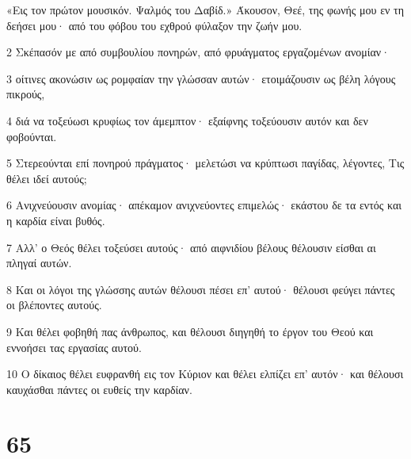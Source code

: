 \par «Εις τον πρώτον μουσικόν. Ψαλμός του Δαβίδ.» Άκουσον, Θεέ, της φωνής μου εν τη δεήσει μου· από του φόβου του εχθρού φύλαξον την ζωήν μου.
\par 2 Σκέπασόν με από συμβουλίου πονηρών, από φρυάγματος εργαζομένων ανομίαν·
\par 3 οίτινες ακονώσιν ως ρομφαίαν την γλώσσαν αυτών· ετοιμάζουσιν ως βέλη λόγους πικρούς,
\par 4 διά να τοξεύωσι κρυφίως τον άμεμπτον· εξαίφνης τοξεύουσιν αυτόν και δεν φοβούνται.
\par 5 Στερεούνται επί πονηρού πράγματος· μελετώσι να κρύπτωσι παγίδας, λέγοντες, Τις θέλει ιδεί αυτούς;
\par 6 Ανιχνεύουσιν ανομίας· απέκαμον ανιχνεύοντες επιμελώς· εκάστου δε τα εντός και η καρδία είναι βυθός.
\par 7 Αλλ' ο Θεός θέλει τοξεύσει αυτούς· από αιφνιδίου βέλους θέλουσιν είσθαι αι πληγαί αυτών.
\par 8 Και οι λόγοι της γλώσσης αυτών θέλουσι πέσει επ' αυτού· θέλουσι φεύγει πάντες οι βλέποντες αυτούς.
\par 9 Και θέλει φοβηθή πας άνθρωπος, και θέλουσι διηγηθή το έργον του Θεού και εννοήσει τας εργασίας αυτού.
\par 10 Ο δίκαιος θέλει ευφρανθή εις τον Κύριον και θέλει ελπίζει επ' αυτόν· και θέλουσι καυχάσθαι πάντες οι ευθείς την καρδίαν.

\chapter{65}

